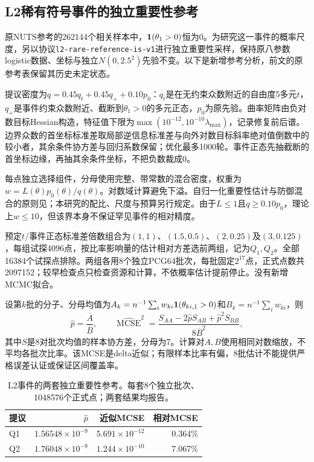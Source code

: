 \subsection{L2稀有符号事件的独立重要性参考}
原NUTS参考的262144个相关样本中，$\mathbf{1}(\theta_1>0)$恒为0。为研究这一事件的概率尺度，另以协议\texttt{l2-rare-reference-is-v1}进行独立重要性采样，保持原八参数logistic数据、坐标与独立$N(0,2.5^2)$先验不变。以下是新增参考分析，前文的原参考表保留其历史未定状态。

提议密度为$q=0.45q_t+0.45q_++0.10p_0$：$q_t$是在无约束众数附近的自由度5多元$t$，$q_+$是事件约束众数附近、截断到$\theta_1>0$的多元正态，$p_0$为原先验。曲率矩阵由负对数目标Hessian构造，特征值下限为$\max(10^{-12},10^{-10}\lambda_{\max})$，记录修复前后谱。边界众数的首坐标标准差取局部逆信息标准差与向外对数目标斜率绝对值倒数中的较小者，其余条件协方差与回归系数保留；优化最多1000轮。事件正态先抽截断的首坐标边缘，再抽其余条件坐标，不把负数裁成0。

每点独立选择组件，分母使用完整、带常数的混合密度，权重为$w=L(\theta)p_0(\theta)/q(\theta)$。对数域计算避免下溢。自归一化重要性估计与防御混合的原则见\cite{owen}；本研究的配比、尺度与预算另行规定。由于$L\leq1$且$q\geq0.10p_0$，理论上$w\leq10$，但该界本身不保证罕见事件的相对精度。

预定$t$/事件正态标准差倍数组合为$(1,1)$、$(1.5,0.5)$、$(2,0.25)$及$(3,0.125)$，每组试探4096点，按比率影响量的估计相对方差选前两组，记为$Q_1,Q_2$。全部16384个试探点排除。两组各用8个独立PCG64批次，每批固定$2^{17}$点，正式点数共2097152；较早检查点只检查资源和计算，不依概率估计提前停止。没有新增MCMC拟合。

设第$k$批的分子、分母均值为$A_k=n^{-1}\sum_iw_{ki}\mathbf{1}(\theta_{ki,1}>0)$和$B_k=n^{-1}\sum_iw_{ki}$，则
\[
\widehat p=\frac{\overline A}{\overline B},\qquad
\widehat{\operatorname{MCSE}}^2=
\frac{S_{AA}-2\widehat pS_{AB}+\widehat p^2S_{BB}}
{8\overline B^2},
\]
其中$S$是8对批次均值的样本协方差，分母为7。计算对$A,B$使用相同对数缩放，不平均各批次比率。该MCSE是delta近似；有限样本比率有偏，8批估计不能提供严格误差认证或保证区间覆盖率。

\begin{table}[htbp]\centering\small
\begin{tabular}{lrrr}\toprule
提议 & $\widehat p$ & 近似MCSE & 相对MCSE\\\midrule
Q1 & $1.56548\times10^{-9}$ & $5.691\times10^{-12}$ & 0.364\%\\
Q2 & $1.76048\times10^{-9}$ & $1.244\times10^{-10}$ & 7.067\%\\
\bottomrule\end{tabular}
\caption{L2事件的两套独立重要性参考。每套8个独立批次、1048576个正式点；两套结果均报告。}
\label{tab:l2-importance-estimates}
\end{table}

